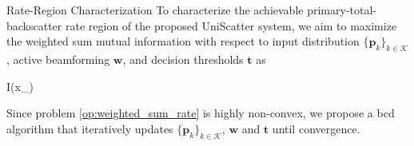 \documentclass[journal]{IEEEtran}
\begin{document}
\begin{section}{Rate-Region Characterization}
	To characterize the achievable primary-total-backscatter rate region of the proposed UniScatter system, we aim to maximize the weighted sum mutual information with respect to input distribution $\{\boldsymbol{p}_k\}_{k \in \mathcal{K}}$, active beamforming $\boldsymbol{w}$, and decision thresholds $\boldsymbol{t}$ as
	\begin{maxi!}
		{}{I(x_{})}{\label{op:weighted_sum_rate}}{\label{ob:weighted_sum_rate}}
	\end{maxi!}
	Since problem \eqref{op:weighted_sum_rate} is highly non-convex, we propose a \gls{bcd} algorithm that iteratively updates $\{\boldsymbol{p}_k\}_{k \in \mathcal{K}}$, $\boldsymbol{w}$ and $\boldsymbol{t}$ until convergence.


\end{section}
\end{document}

